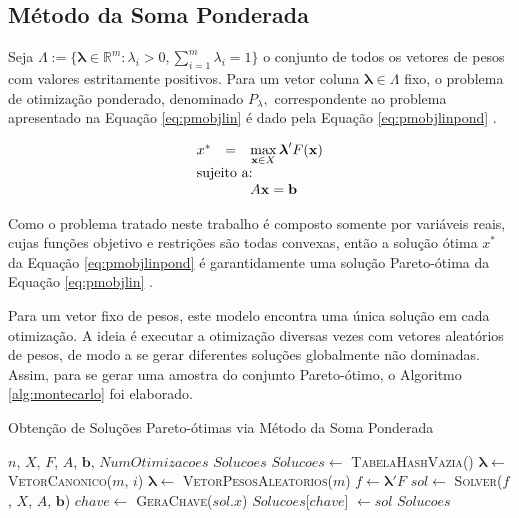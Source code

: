 \documentclass [11pt]{articleSBPO}
\begin{document}
\subsection{Método da Soma Ponderada}

Seja $\Lambda := \{ \boldsymbol{\lambda} \in \mathbb{R}^m: \lambda_i > 0, \sum_{i=1}^m \lambda_i = 1 \}$ o conjunto de todos os vetores de pesos com valores estritamente positivos. Para um vetor coluna $\boldsymbol{\lambda} \in \Lambda$ fixo, o problema de otimização ponderado, denominado $ P_{\lambda}, $ correspondente ao problema apresentado na Equação \ref{eq:pmobjlin} é dado pela Equação \ref{eq:pmobjlinpond} \cite{steuer1986multiple,takahashi2007otimizacao}.

\begin{equation}
\begin{array}{lll}
x^{*} & = & \displaystyle\max_{\mathbf{x} \in X} \boldsymbol{\lambda}' F(\mathbf{x}) \\
\multicolumn{3}{l}{\mbox{sujeito a:}} \\
& & A \mathbf{x} = \mathbf{b}
\end{array}
\label{eq:pmobjlinpond}
\end{equation}

Como o problema tratado neste trabalho é composto somente por variáveis reais, cujas funções objetivo e restrições são todas convexas, então a solução ótima $x^{*}$ da Equação \ref{eq:pmobjlinpond} é garantidamente uma solução Pareto-ótima da Equação \ref{eq:pmobjlin} \cite{steuer1986multiple,takahashi2007otimizacao}.

Para um vetor fixo de pesos, este modelo encontra uma única solução em cada otimização. A ideia é executar a otimização diversas vezes com vetores aleatórios de pesos, de modo a se gerar diferentes soluções globalmente não dominadas. Assim, para se gerar uma amostra do conjunto Pareto-ótimo, o Algoritmo \ref{alg:montecarlo} foi elaborado.

\begin{algorithm}
\caption{Obtenção de Soluções Pareto-ótimas via Método da Soma Ponderada}
\label{alg:montecarlo}
\begin{algorithmic}
	\REQUIRE $n$, $X$, $F$, $A$, $\mathbf{b}$, $NumOtimizacoes$
	\ENSURE $Solucoes$
	\STATE $Solucoes \leftarrow $ \textsc{TabelaHashVazia}()
    		\STATE $\boldsymbol{\lambda} \leftarrow$ \textsc{VetorCanonico}($m$, $i$)
    	\ELSE
	        \STATE $\boldsymbol{\lambda} \leftarrow$ \textsc{VetorPesosAleatorios}($m$)
    	\ENDIF
        \STATE $f \leftarrow \boldsymbol{\lambda}' F$
        \STATE $sol \leftarrow $ \textsc{Solver}($f$, $X$, $A$, $\mathbf{b}$)
        \STATE $ chave \leftarrow $ \textsc{GeraChave}($sol.x$)
            \STATE $Solucoes$[$chave$] $\leftarrow sol$
        \ENDIF
    \ENDFOR
    \RETURN $ Solucoes $
\end{algorithmic}
\end{algorithm}
\end{document}
